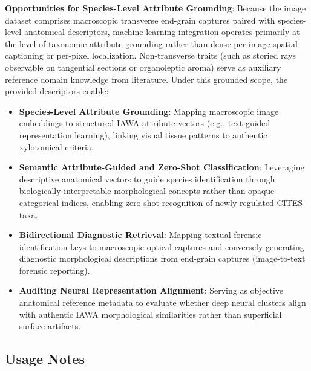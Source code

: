 \documentclass[a4paper,fleqn,12pt]{cas-sc}
\begin{document}
\noindent
\textbf{Opportunities for Species-Level Attribute Grounding}:
Because the image dataset comprises macroscopic transverse end-grain captures paired with species-level anatomical descriptors, machine learning integration operates primarily at the level of taxonomic attribute grounding rather than dense per-image spatial captioning or per-pixel localization. Non-transverse traits (such as storied rays observable on tangential sections or organoleptic aroma) serve as auxiliary reference domain knowledge from literature. Under this grounded scope, the provided descriptors enable:
\begin{itemize}[leftmargin=*,itemsep=2pt,topsep=2pt]
    \item \textbf{Species-Level Attribute Grounding}: Mapping macroscopic image embeddings to structured IAWA attribute vectors (e.g., text-guided representation learning), linking visual tissue patterns to authentic xylotomical criteria.
    \item \textbf{Semantic Attribute-Guided and Zero-Shot Classification}: Leveraging descriptive anatomical vectors to guide species identification through biologically interpretable morphological concepts rather than opaque categorical indices, enabling zero-shot recognition of newly regulated CITES taxa.
    \item \textbf{Bidirectional Diagnostic Retrieval}: Mapping textual forensic identification keys to macroscopic optical captures and conversely generating diagnostic morphological descriptions from end-grain captures (image-to-text forensic reporting).
    \item \textbf{Auditing Neural Representation Alignment}: Serving as objective anatomical reference metadata to evaluate whether deep neural clusters align with authentic IAWA morphological similarities rather than superficial surface artifacts.
\end{itemize}

\subsection{Usage Notes}
\label{sec:usage_notes}
\end{document}
